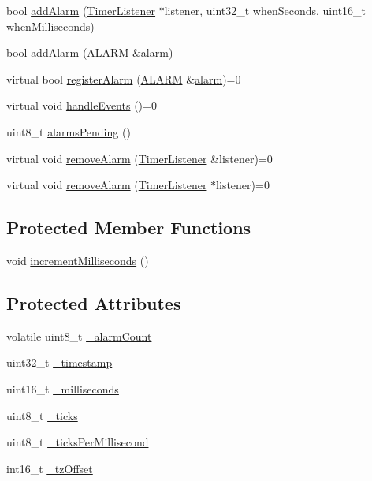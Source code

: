 \begin{DoxyCompactItemize}
\item 
bool \hyperlink{classmhvlib_1_1_r_t_c_a2ec2f624aa9870fd04bfb161334dbba7}{add\-Alarm} (\hyperlink{classmhvlib_1_1_timer_listener}{Timer\-Listener} $\ast$listener, uint32\-\_\-t when\-Seconds, uint16\-\_\-t when\-Milliseconds)
\item 
bool \hyperlink{classmhvlib_1_1_r_t_c_a6244f80e3a32eff6274451c34078dd3d}{add\-Alarm} (\hyperlink{namespacemhvlib_a3fa96bbaa152dfe112dd50663d5caef5}{A\-L\-A\-R\-M} \&\hyperlink{structmhvlib_1_1alarm}{alarm})
\item 
virtual bool \hyperlink{classmhvlib_1_1_r_t_c_a01d3852ef9e585676a3c31c9ea142485}{register\-Alarm} (\hyperlink{namespacemhvlib_a3fa96bbaa152dfe112dd50663d5caef5}{A\-L\-A\-R\-M} \&\hyperlink{structmhvlib_1_1alarm}{alarm})=0
\item 
virtual void \hyperlink{classmhvlib_1_1_r_t_c_ab65b29ec1b86852867563774b5859f9c}{handle\-Events} ()=0
\item 
uint8\-\_\-t \hyperlink{classmhvlib_1_1_r_t_c_a951ba6ed32251d5429146ae0a53776e9}{alarms\-Pending} ()
\item 
virtual void \hyperlink{classmhvlib_1_1_r_t_c_a8204a5e30e83c92bd300757a88aaf5b0}{remove\-Alarm} (\hyperlink{classmhvlib_1_1_timer_listener}{Timer\-Listener} \&listener)=0
\item 
virtual void \hyperlink{classmhvlib_1_1_r_t_c_a453ff9d87c1e20861cd5a5402469593e}{remove\-Alarm} (\hyperlink{classmhvlib_1_1_timer_listener}{Timer\-Listener} $\ast$listener)=0
\end{DoxyCompactItemize}
\subsection*{Protected Member Functions}
\begin{DoxyCompactItemize}
\item 
void \hyperlink{classmhvlib_1_1_r_t_c_ae1aee6c31af6197b0aa6edaded12b8a0}{increment\-Milliseconds} ()
\end{DoxyCompactItemize}
\subsection*{Protected Attributes}
\begin{DoxyCompactItemize}
\item 
volatile uint8\-\_\-t \hyperlink{classmhvlib_1_1_r_t_c_a0936e7af2c9071bce11a2f2abb58df40}{\-\_\-alarm\-Count}
\item 
uint32\-\_\-t \hyperlink{classmhvlib_1_1_r_t_c_ac9bca1039573baccfd05fd2ccb219495}{\-\_\-timestamp}
\item 
uint16\-\_\-t \hyperlink{classmhvlib_1_1_r_t_c_a22ee8aadbcec10d624e37ce4c1c2796a}{\-\_\-milliseconds}
\item 
uint8\-\_\-t \hyperlink{classmhvlib_1_1_r_t_c_a85bb4d09098ea477190bd97b08c09e7d}{\-\_\-ticks}
\item 
uint8\-\_\-t \hyperlink{classmhvlib_1_1_r_t_c_ae87ddcdc3c98b9fc9d762fdcadb758f5}{\-\_\-ticks\-Per\-Millisecond}
\item 
int16\-\_\-t \hyperlink{classmhvlib_1_1_r_t_c_a27f82fc89f040744c940bbe98d57f1b1}{\-\_\-tz\-Offset}
\end{DoxyCompactItemize}


